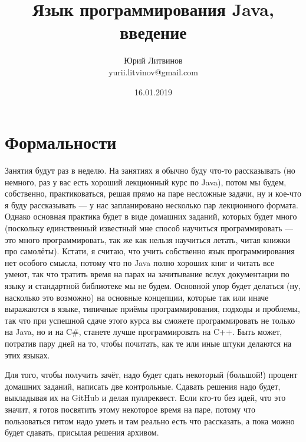 \documentclass[a5paper]{article}
\title{Язык программирования Java, введение}
\author{Юрий Литвинов\\\small{yurii.litvinov@gmail.com}}
\date{16.01.2019}
\begin{document}
\maketitle
\thispagestyle{empty}

\section{Формальности}

Занятия будут раз в неделю. На занятиях я обычно буду что-то рассказывать (но немного, раз у вас есть хороший лекционный курс по Java), потом мы будем, собственно, практиковаться, решая прямо на паре несложные задачи, ну и кое-что я буду рассказывать --- у нас запланировано несколько пар лекционного формата. Однако основная практика будет в виде домашних заданий, которых будет много (поскольку единственный известный мне способ научиться программировать --- это много программировать, так же как нельзя научиться летать, читая книжки про самолёты). Кстати, я считаю, что учить собственно язык программирования нет особого смысла, потому что по Java полно хороших книг и читать все умеют, так что тратить время на парах на зачитывание вслух документации по языку и стандартной библиотеке мы не будем. Основной упор будет делаться (ну, насколько это возможно) на основные концепции, которые так или иначе выражаются в языке, типичные приёмы программирования, подходы и проблемы, так что при успешной сдаче этого курса вы сможете программировать не только на Java, но и на C\#, станете лучше программировать на C++. Быть может, потратив пару дней на то, чтобы почитать, как те или иные штуки делаются на этих языках.

Для того, чтобы получить зачёт, надо будет сдать некоторый (большой!) процент домашних заданий, написать две контрольные. Сдавать решения надо будет, выкладывая их на GitHub и делая пуллреквест. Если кто-то без идей, что это значит, я готов посвятить этому некоторое время на паре, потому что пользоваться гитом надо уметь и там реально есть что рассказать, а пока можно будет сдавать, присылая решения архивом. 
\end{document}
